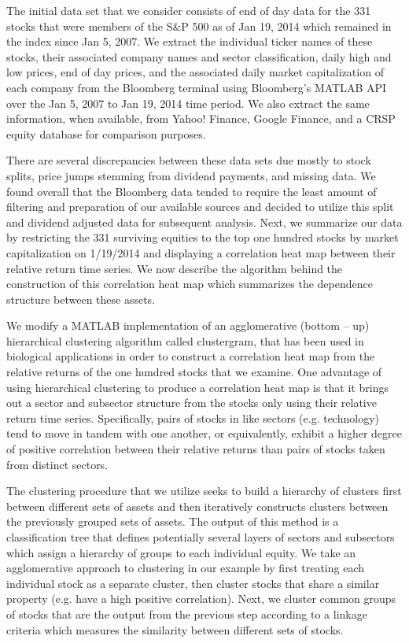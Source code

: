 \documentclass{amsart}
\begin{document}
The initial data set that we consider consists 
of end of day data for the 331 stocks that were members of the  
S\&P 500 as of Jan 19, 2014 which remained in the index since Jan 5, 2007.  
We extract the individual ticker names of these stocks, their associated company names and 
sector classification, daily high and low prices, end of day prices, 
and the associated daily market capitalization of each company from the Bloomberg terminal 
using Bloomberg's MATLAB API over the Jan 5, 2007 to Jan 19, 2014 time period.  
We also extract the same information, when available, from Yahoo! Finance, 
Google Finance, and a CRSP equity database for comparison purposes.

There are several discrepancies between these data sets due mostly to stock splits, 
price jumps stemming from dividend payments, and missing data.  
We found overall that the Bloomberg data tended to require the least amount of filtering 
and preparation of our available sources 
and  decided to utilize this split and dividend adjusted data for subsequent 
analysis. Next, we summarize our data by restricting
the 331 surviving equities to the top one hundred 
stocks by market capitalization on 1/19/2014 and 
displaying a correlation heat map between their relative return time series.
We now describe the algorithm behind the construction of 
this correlation heat map which summarizes the dependence structure between these assets.

We modify a MATLAB implementation of an agglomerative (bottom -- up) hierarchical clustering algorithm 
called clustergram, that has been used in biological applications \cite{Bar-Joseph-01} in order 
to construct 
a correlation heat map from the relative returns of the one hundred stocks that we examine.
One advantage of using hierarchical clustering to produce a correlation heat map is that 
it brings out a sector and subsector structure from the stocks only using their relative return 
time series. 
Specifically, pairs of stocks in like sectors (e.g. technology) tend to move in tandem with 
one another, or equivalently, exhibit a higher degree of positive correlation between their relative returns
than pairs of stocks taken from distinct sectors. 

The clustering procedure that we utilize seeks to build a hierarchy of clusters first between
different sets of assets and then iteratively constructs  
clusters between the previously grouped sets of assets. 
The output of this method is a classification tree that defines potentially several layers 
of sectors and subsectors which assign a hierarchy of groups to each individual equity. 
We take an agglomerative approach to clustering in our example by first
treating each individual stock as a separate cluster, then cluster stocks that share a similar property 
(e.g. have a high positive correlation).  Next, we cluster common groups of stocks 
that are the output from the previous step according to a linkage criteria which measures the similarity between different sets of stocks.
\end{document}
